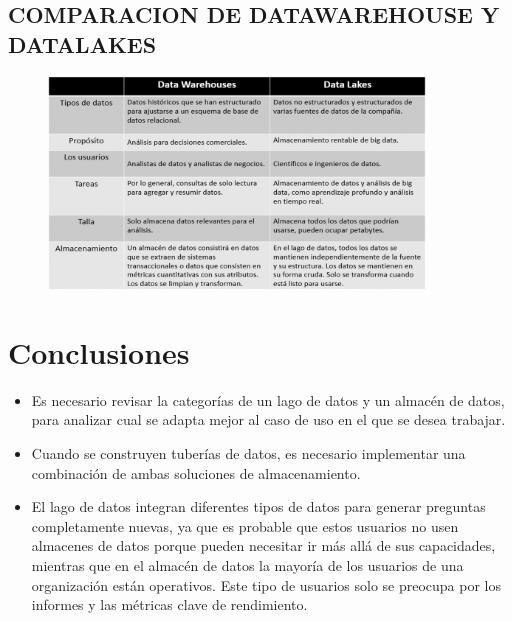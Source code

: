 \documentclass[%
 reprint,
 amsmath,amssymb,
 aps,
]{revtex4-1}
\begin{document}

\subsection{COMPARACION DE DATAWAREHOUSE Y DATALAKES}	
\begin{figure}[htb]
				\begin{center}
					\includegraphics[width=10cm]{./IMAGENES/Imagen1}
				\end{center}
			\end{figure}
\section{Conclusiones}

\begin{itemize}
\item Es necesario revisar la categorías de un lago de datos y un almacén de datos, para analizar cual se adapta mejor al caso de uso en el que se desea trabajar.
\item Cuando se construyen tuberías de datos, es necesario implementar una combinación de ambas soluciones de almacenamiento.
\item El lago de datos integran diferentes tipos de datos para generar preguntas completamente nuevas, ya que es probable que estos usuarios no usen almacenes de datos porque pueden necesitar ir más allá de sus capacidades, mientras que en el almacén de datos la mayoría de los usuarios de una organización están operativos. Este tipo de usuarios solo se preocupa por los informes y las métricas clave de rendimiento.

\end{itemize}






\end{document}
